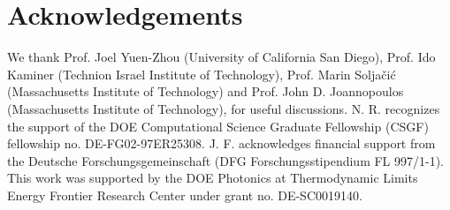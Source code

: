 \documentclass[aps,prl,twocolumn,
	groupedaddress,superscriptaddress,
	amsfonts,amssymb,amsmath,floatfix,
	citeautoscript]{revtex4-1}
\begin{document}



\section{Acknowledgements}
We thank Prof. Joel Yuen-Zhou (University of California San Diego), Prof. Ido Kaminer (Technion Israel Institute of Technology), Prof. Marin Solja\v{c}i\'{c} (Massachusetts Institute of Technology) and Prof. John D. Joannopoulos (Massachusetts Institute of Technology), for useful discussions. N. R. recognizes the support of the DOE Computational Science Graduate Fellowship (CSGF) fellowship no.  DE-FG02-97ER25308. J. F. acknowledges financial support from the Deutsche Forschungsgemeinschaft (DFG Forschungsstipendium FL 997/1-1). This work was supported by the DOE Photonics at Thermodynamic Limits Energy Frontier Research Center under grant no. DE-SC0019140.





\end{document}
